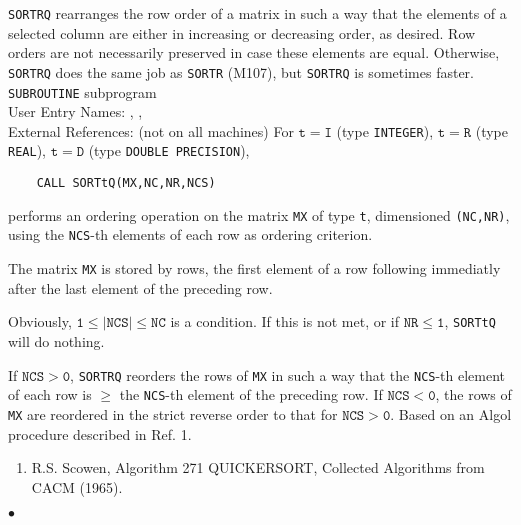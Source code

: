                                
                            
                         
                        
{\tt SORTRQ} rearranges the row order of a matrix in such a way that the
elements of a selected column are either in increasing or decreasing
order, as desired. Row orders are not necessarily preserved in case
these elements are equal. Otherwise, {\tt SORTRQ} does the same job as
{\tt SORTR} (M107), but {\tt SORTRQ} is sometimes faster.
\Structure
{\tt SUBROUTINE} subprogram  \\
User Entry Names: , , \\
External References:  (not on all machines)
\Usage
For $\mathtt{t=I}$ (type {\tt INTEGER}),
$\mathtt{t=R}$ (type {\tt REAL}), $\mathtt{t=D}$ (type
{\tt DOUBLE PRECISION}),
\begin{verbatim}
    CALL SORTtQ(MX,NC,NR,NCS)
\end{verbatim}
performs an ordering operation on the matrix {\tt MX} of type {\tt t},
dimensioned
{\tt (NC,NR)}, using the {\tt NCS}-th elements of each row as ordering
criterion.
\par
The matrix {\tt MX} is stored by rows, the first element of a row
following immediatly after the last element of the preceding row.
\par
Obviously, $\mathtt{1 \leq |NCS| \leq NC}$ is a condition. If
this is not met, or if $\mathtt{NR \leq 1}$, {\tt SORTtQ} will do
nothing.
\par
If $\mathtt{NCS > 0}$, {\tt SORTRQ} reorders the rows of {\tt MX} in such a
way that the {\tt NCS}-th element of each row is $\geq$ the {\tt NCS}-th
element of the preceding row. If $\mathtt{NCS < 0}$, the rows of {\tt MX}
are reordered in the strict reverse order to that for $\mathtt{NCS > 0}$.
\Source
Based on an Algol procedure described in Ref. 1.
\Refer
\begin{enumerate}
\item R.S. Scowen, Algorithm 271 QUICKERSORT, Collected Algorithms
from CACM (1965).
\end{enumerate}
$\bullet$
